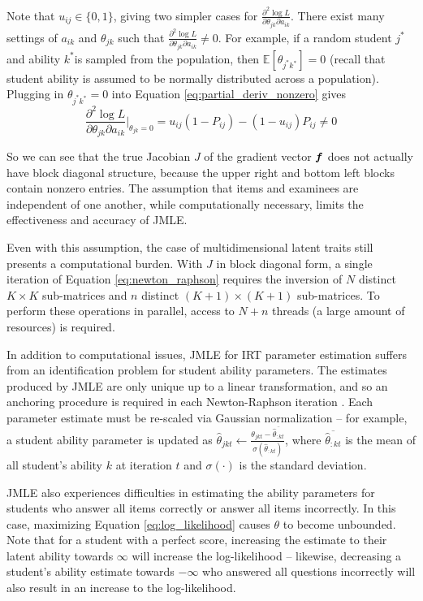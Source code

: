 Note that $u_{ij} \in \{0,1\}$, giving two simpler cases for $\displaystyle\frac{\partial^2 \log L}{\partial \theta_{jk} \partial a_{ik}}$. There exist many settings of $a_{ik}$ and $\theta_{jk}$ such that  $\displaystyle\frac{\partial^2 \log L}{\partial \theta_{jk} \partial a_{ik}} \not = 0$. For example, if a random student $j^*$ and ability $k^*$is sampled from the population, then $\mathbb{E}[\theta_{j^*k^*}] = 0$ (recall that student ability is assumed to be normally distributed across a population). Plugging in $\theta_{j^*k^*} = 0$ into Equation \ref{eq:partial_deriv_nonzero} gives
\[\frac{\partial^2 \log L}{\partial \theta_{jk} \partial a_{ik}}\Big|_{\theta_{jk}=0} = u_{ij}(1-P_{ij}) - (1-u_{ij})P_{ij} \not= 0 \]

So we can see that the true Jacobian $J$ of the gradient vector $\boldsymbol{f}$ does not actually have block diagonal structure, because the upper right and bottom left blocks contain nonzero entries. The assumption that items and examinees are independent of one another, while computationally necessary, limits the effectiveness and accuracy of JMLE. 

Even with this assumption, the case of multidimensional latent traits still presents a computational burden. With $J$ in block diagonal form, a single iteration of Equation \ref{eq:newton_raphson} requires the inversion of $N$ distinct $K\times K$ sub-matrices and $n$ distinct $(K+1) \times (K+1)$ sub-matrices. To perform these operations in parallel, access to $N + n$ threads (a large amount of resources) is required.

In addition to computational issues, JMLE for IRT parameter estimation suffers from an identification problem for student ability parameters. The estimates produced by JMLE are only unique up to a linear transformation, and so an anchoring procedure is required in each Newton-Raphson iteration \cite{baker_kim2004}. Each parameter estimate must be re-scaled via Gaussian normalization -- for example, a student ability parameter is updated as $\hat \theta_{jkt} \gets \displaystyle\frac{\theta_{jkt} - \overline{\hat \theta_{:kt}}}{\sigma(\hat \theta_{:kt})}$, where $\overline{\hat \theta_{:kt}}$ is the mean of all student's ability $k$ at iteration $t$ and  $\sigma(\cdot)$ is the standard deviation.

JMLE also experiences difficulties in estimating the ability parameters for students who answer all items correctly or answer all items incorrectly. In this case, maximizing Equation \ref{eq:log_likelihood} causes $\theta$ to become unbounded. Note that for a student with a perfect score, increasing the estimate to their latent ability towards $\infty$ will increase the log-likelihood -- likewise, decreasing a student's ability estimate towards $-\infty$ who answered all questions incorrectly will also result in an increase to the log-likelihood.

